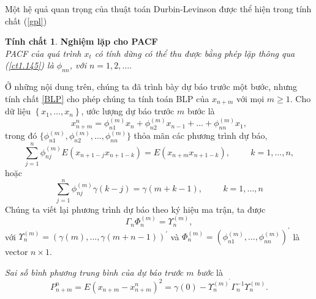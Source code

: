 \documentclass[12pt, a4paper,oneside]{book}
\theoremstyle{definition}
\newtheorem{tc}[theo]{Tính chất}
\begin{document}
Một hệ quả quan trọng của thuật toán Durbin-Levinson được thể hiện trong tính chất (\ref{gpl})\begin{tc}\cite{1} \textbf{\label{gpl}Nghiệm lặp cho PACF}\\
	\textit{PACF của quá trình $x_{t}$ có tính dừng có thể thu được bằng phép lặp thông qua (\ref{ct1.145}) là $\phi_{nn}$, với $n= 1, 2, \dots .$}
\end{tc}

Ở những nội dung trên, chúng ta đã trình bày dự báo trước một bước, nhưng tính chất \ref{BLP} cho phép chúng ta tính toán BLP của $x_{n+m}$ với mọi $m \geq 1$. Cho dữ liệu $\left\lbrace x_{1}, \dots, x_{n}\right\rbrace$, ước lượng dự báo trước $m$ bước là
\begin{equation}
x_{n+m}^{n}= \phi_{n1}^{(m)}x_{n} + \phi_{n2}^{(m)}x_{n-1}+ \dots+ \phi_{nn}^{(m)}x_{1}, \label{ct1.147}
\end{equation}	
trong đó $\{\phi_{n1}^{(m)}, \phi_{n2}^{(m)}, \dots, \phi_{nn}^{(m)}\}$ thỏa mãn các phương trình dự báo,
$$\sum_{j=1}^{n}\phi_{nj}^{(m)}E(x_{n+1-j}x_{n+1-k})= E (x_{n+m}x_{n+1-k}),\hspace{1cm} k= 1, \dots, n,$$
hoặc 
\begin{equation}
\sum_{j=1}^{n}\phi_{nj}^{(m)}\gamma(k-j)=\gamma(m+k-1), \hspace{1cm} k=1, \dots, n \label{ct1.149}
\end{equation}	 
Chúng ta viết lại phương trình dự báo theo ký hiệu ma trận, ta được
\begin{equation}
\Gamma_{n}\varPhi_{n}^{(m)}= \varUpsilon_{n}^{(m)}, \label{ct1.150}
\end{equation}
với $\varUpsilon_{n}^{(m)}= (\gamma(m), \dots, \gamma(m+n-1))^{'}$
và $\varPhi_{n}^{(m)} = (\phi_{n1}^{(m)}, \dots, \phi_{nn}^{(m)})^{'}$ là vector $n\times 1$.

\textit{Sai số bình phương trung bình của dự báo trước $m$ bước} là
\begin{equation}
P_{n+m}^{n} = E (x_{n+m}- x_{n+m}^{n})^{2} = \gamma(0) - \varUpsilon_{n}^{(m)^{'}}\Gamma_{n}^{-1}\varUpsilon_{n}^{(m)}. \label{ct1.151}
\end{equation}
\end{document}
